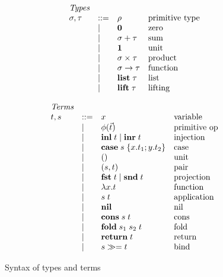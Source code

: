 \begin{figure}
  \begin{subfigure}[t]{0.48\linewidth}
  \small
  \[
  \begin{array}{lllll}
    & \textit{Types}
    \\
    &
    \sigma, \tau
    & ::= &
    \rho
    &
    \text{primitive type}
    \\
    && \mid &
    \mathbf{0}
    &
    \text{zero}
    \\
    && \mid &
    \sigma + \tau
    &
    \text{sum}
    \\
    && \mid &
    \mathbf{1}
    &
    \text{unit}
    \\
    && \mid &
    \sigma \times \tau
    &
    \text{product}
    \\
    && \mid &
    \sigma \to \tau
    &
    \text{function}
    \\
    && \mid &
    \mathbf{list}\;\tau
    &
    \text{list}
    \\
    && \mid &
    \mathbf{lift}\;\tau
    &
    \text{lifting}
  \end{array}
  \]
  \end{subfigure}%
  \begin{subfigure}[t]{0.48\linewidth}
  \small
  \[
  \begin{array}{lllll}
    & \textit{Terms}
    \\
    &
    t, s
    & ::= &
    x
    &
    \text{variable}
    \\
    && \mid &
    \phi(\vec t)
    &
    \text{primitive op}
    \\
    && \mid &
    \mathbf{inl}\;t \mid \mathbf{inr}\;t
    &
    \text{injection}
    \\
    && \mid &
    \mathbf{case}\;s\;\{x.t_1; y.t_2\}
    &
    \text{case}
    \\
    && \mid &
    ()
    &
    \text{unit}
    \\
    && \mid &
    (s,t)
    &
    \text{pair}
    \\
    && \mid &
    \mathbf{fst}\;t \mid \mathbf{snd}\;t
    &
    \text{projection}
    \\
    && \mid &
    \lambda x.t
    &
    \text{function}
    \\
    && \mid &
    s\;t
    &
    \text{application}
    \\
    && \mid &
    \mathbf{nil}
    &
    \text{nil}
    \\
    && \mid &
    \mathbf{cons}\;s\;t
    &
    \text{cons}
    \\
    && \mid &
    \mathbf{fold}\;s_1\;s_2\;t
    &
    \text{fold}
    \\
    && \mid &
    \mathbf{return}\;t
    &
    \text{return}
    \\
    && \mid &
    {s}\gg={t}
    &
    \text{bind}
  \end{array}
  \]
  \end{subfigure}
  \caption{Syntax of types and terms}
  \label{fig:syntax}
\end{figure}
